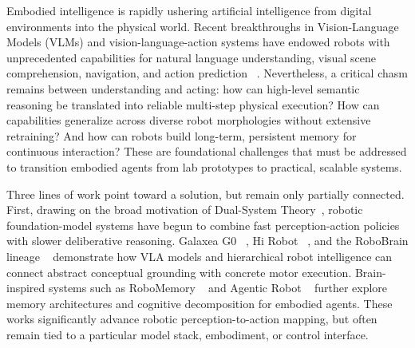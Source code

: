 Embodied intelligence is rapidly ushering artificial intelligence from digital environments into the physical world. Recent breakthroughs in Vision-Language Models (VLMs) and vision-language-action systems have endowed robots with unprecedented capabilities for natural language understanding, visual scene comprehension, navigation, and action prediction ~\cite{gong2026poinavbenchmarkingenhancingfinalmeters,chen2026explorelikehumansautonomous,chu2026abotn0technicalreportvla,chen2026astranavworldworldmodelforesight,xiang2025navr2dualrelationreasoninggeneralizable,Liu_2026_CVPR,Chen_2026_CVPR,xue2026omninavunifiedframeworkprospective}. Nevertheless, a critical chasm remains between understanding and acting: how can high-level semantic reasoning be translated into reliable multi-step physical execution? How can capabilities generalize across diverse robot morphologies without extensive retraining? And how can robots build long-term, persistent memory for continuous interaction? These are foundational challenges that must be addressed to transition embodied agents from lab prototypes to practical, scalable systems.


Three lines of work point toward a solution, but remain only partially connected. First, drawing on the broad motivation of Dual-System Theory~\cite{team2025gemini}, robotic foundation-model systems have begun to combine fast perception-action policies with slower deliberative reasoning. Galaxea G0 ~\cite{jiang2025galaxea}, Hi Robot ~\cite{shi2025hi}, and the RoboBrain lineage ~\cite{ji2025robobrain,team2025robobrain} demonstrate how VLA models and hierarchical robot intelligence can connect abstract conceptual grounding with concrete motor execution. Brain-inspired systems such as RoboMemory ~\cite{lei2025robomemory} and Agentic Robot ~\cite{yang2025agentic} further explore memory architectures and cognitive decomposition for embodied agents. These works significantly advance robotic perception-to-action mapping, but often remain tied to a particular model stack, embodiment, or control interface.

